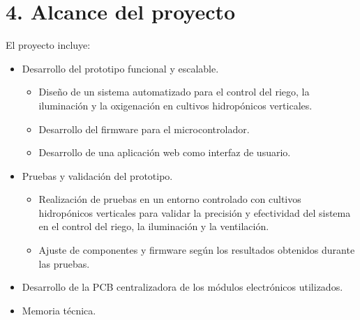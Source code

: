 \documentclass[
11pt, %
]{charter}
\begin{document}
\section{4. Alcance del proyecto}
\label{sec:alcance}




El proyecto incluye:
\begin{itemize}
	\item Desarrollo del prototipo funcional y escalable.
		\begin{itemize}
		\item Diseño de un sistema automatizado para el control del riego, la iluminación y la oxigenación en cultivos hidropónicos verticales.
		\item Desarrollo del firmware para el microcontrolador.
		\item Desarrollo de una aplicación web como interfaz de usuario.
		\end{itemize}
	\item Pruebas y validación del prototipo.
		\begin{itemize}
		\item Realización de pruebas en un entorno controlado con cultivos hidropónicos verticales para validar la precisión y efectividad del sistema en el control del riego, la iluminación y la ventilación.
		\item Ajuste de componentes y firmware según los resultados obtenidos durante las pruebas.
		\end{itemize}
	\item Desarrollo de la PCB centralizadora de los módulos electrónicos utilizados.
	\item Memoria técnica.
	
\end{itemize}
\end{document}

